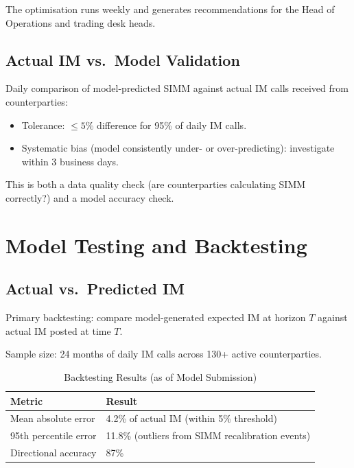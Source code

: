 \documentclass[11pt,a4paper]{article}
\begin{document}
The optimisation runs weekly and generates recommendations for the Head of Operations and
trading desk heads.

\subsection{Actual IM vs.\ Model Validation}

Daily comparison of model-predicted SIMM against actual IM calls received from counterparties:
\begin{itemize}[leftmargin=*]
  \item Tolerance: $\leq 5\%$ difference for 95\% of daily IM calls.
  \item Systematic bias (model consistently under- or over-predicting): investigate within 3 business days.
\end{itemize}

This is both a data quality check (are counterparties calculating SIMM correctly?) and a
model accuracy check.

\section{Model Testing and Backtesting}

\subsection{Actual vs.\ Predicted IM}

Primary backtesting: compare model-generated expected IM at horizon $T$ against actual IM
posted at time $T$.

Sample size: 24 months of daily IM calls across 130+ active counterparties.

\begin{table}[h!]
\centering
\caption{Backtesting Results (as of Model Submission)}
\begin{tabular}{@{}ll@{}}
\toprule
\textbf{Metric} & \textbf{Result} \\
\midrule
Mean absolute error            & 4.2\% of actual IM (within 5\% threshold) \\
95th percentile error          & 11.8\% (outliers from SIMM recalibration events) \\
Directional accuracy           & 87\% \\
\bottomrule
\end{tabular}
\end{table}
\end{document}
